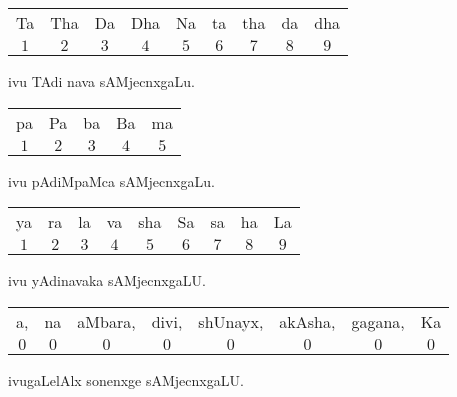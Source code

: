 \begin{center}
\begin{tabular}{ccccccccc}
Ta & Tha & Da & Dha & Na & ta & tha & da & dha\\
$1$ & $2$ & $3$ &$4$ & $5$ & $6$ & $7$ & $8$ &$9$
\end{tabular}
\end{center}
ivu TAdi nava sAMjecnxgaLu.

\begin{center}
\begin{tabular}{ccccc}
pa & Pa & ba & Ba & ma \\
$1$ & $2$ & $3$ &$4$ & $5$ 
\end{tabular}
\end{center}
ivu pAdiMpaMca sAMjecnxgaLu.

\begin{center}
\begin{tabular}{ccccccccc}
ya & ra & la & va & sha & Sa & sa & ha & La\\
$1$ & $2$ & $3$ &$4$ & $5$ & $6$ & $7$ & $8$ &$9$\\
\end{tabular}
\end{center}
ivu yAdinavaka sAMjecnxgaLU.

\begin{center}
\begin{tabular}{cccccccc}
a, & na & aMbara, & divi, & shUnayx, & akAsha, & gagana, & Ka \\
$0$ & $0$ & $0$ &$0$ & $0$ & $0$ & $0$ & $0$ \\
\end{tabular}
\end{center}
ivugaLelAlx sonenxge sAMjecnxgaLU.
